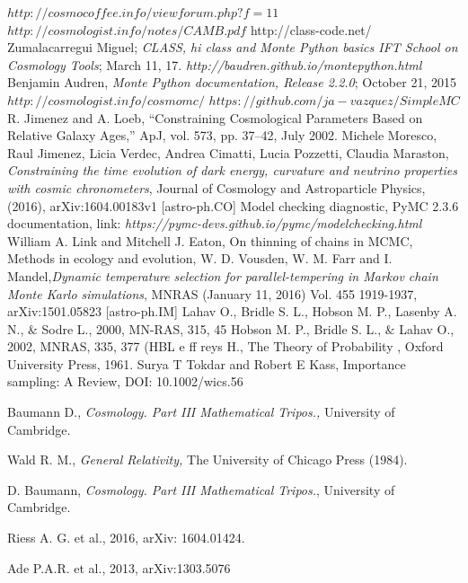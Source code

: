 \documentclass[onecolumn,           %
               showpacs,            %
               preprintnumbers,     %
               aps,                 %
               letterpaper,             %
               superscriptaddress,      %
               nofootinbib,         %
               tightenlines,        %
               floats,floatfix      %
               ,usenatbib,
               ]{revtex4-1}
\begin{document}
\begin{thebibliography}{9}
$http://cosmocoffee.info/viewforum.php?f=11$
 $http://cosmologist.info/notes/CAMB.pdf$
 http://class-code.net/
Zumalacarregui Miguel; \textit{CLASS, hi class and Monte Python basics IFT School on Cosmology Tools}; March 11, 17.
\textit{http://baudren.github.io/montepython.html}
Benjamin Audren, \textit{Monte Python documentation, Release 2.2.0}; October 21, 2015
$http://cosmologist.info/cosmomc/$	
$https://github.com/ja-vazquez/SimpleMC$
%
%
%
%
%
%
R. Jimenez and A. Loeb, “Constraining Cosmological Parameters Based on Relative Galaxy Ages,”
ApJ, vol. 573, pp. 37–42, July 2002.
Michele Moresco, Raul Jimenez, Licia Verdec, Andrea Cimatti, Lucia Pozzetti, Claudia Maraston, \textit{Constraining the time evolution of dark energy, curvature and neutrino properties with cosmic chronometers}, Journal of Cosmology and Astroparticle Physics, (2016), arXiv:1604.00183v1 [astro-ph.CO]
 Model checking diagnostic, PyMC 2.3.6 documentation, link: \textit{https://pymc-devs.github.io/pymc/modelchecking.html}
William A. Link and Mitchell J. Eaton, On thinning of chains in MCMC, Methods in ecology and evolution,
W. D. Vousden, W. M. Farr and I. Mandel,\textit{Dynamic temperature selection for parallel-tempering in Markov chain Monte Karlo simulations}, MNRAS (January 11, 2016) Vol. 455 1919-1937, arXiv:1501.05823 [astro-ph.IM]
Lahav O., Bridle S. L., Hobson M. P., Lasenby A. N., $\&$ Sodre L., 2000, MN-RAS, 315, 45
Hobson M. P., Bridle S. L., $\&$ Lahav O., 2002, MNRAS, 335, 377 (HBL
e
ff
reys H.,
The Theory of Probability
, Oxford University Press, 1961.
Surya T Tokdar and Robert E Kass, Importance sampling: A Review, DOI: 10.1002/wics.56

 Baumann D., \textit{Cosmology. Part III Mathematical Tripos.,} University of Cambridge.

 Wald R. M., \textit{General Relativity,} The University of Chicago Press (1984).

 D. Baumann, {\em Cosmology. Part III Mathematical Tripos.}, University of Cambridge.

 Riess A. G. et al., 2016, arXiv: 1604.01424.

 Ade P.A.R. et al., 2013, arXiv:1303.5076


\end{thebibliography}
\end{document}

